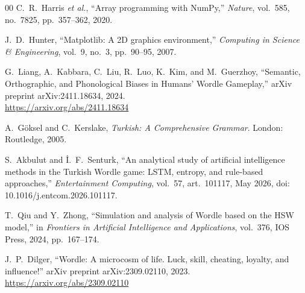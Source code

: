 \documentclass[conference]{IEEEtran}
\begin{document}
\begin{thebibliography}{00}
C.~R.~Harris \textit{et al.}, ``Array programming with NumPy,''
\textit{Nature}, vol.~585, no.~7825, pp.~357--362, 2020.

J.~D.~Hunter, ``Matplotlib: A 2D graphics environment,''
\textit{Computing in Science \& Engineering}, vol.~9, no.~3, pp.~90--95,
2007.

G.~Liang, A.~Kabbara, C.~Liu, R.~Luo, K.~Kim, and M.~Guerzhoy,
``Semantic, Orthographic, and Phonological Biases in Humans' Wordle
Gameplay,'' arXiv preprint arXiv:2411.18634, 2024.\\
\url{https://arxiv.org/abs/2411.18634}

A.~Göksel and C.~Kerslake,
\textit{Turkish: A Comprehensive Grammar}. London: Routledge, 2005.

S.~Akbulut and \.{I}.~F.~Senturk, ``An analytical study of artificial
intelligence methods in the Turkish Wordle game: LSTM, entropy, and
rule-based approaches,'' \textit{Entertainment Computing}, vol.~57,
art.~101117, May 2026, doi: 10.1016/j.entcom.2026.101117.

T.~Qiu and Y.~Zhong, ``Simulation and analysis of Wordle based on the HSW
model,'' in \textit{Frontiers in Artificial Intelligence and Applications},
vol.~376, IOS Press, 2024, pp.~167--174.

J.~P.~Dilger, ``Wordle: A microcosm of life. Luck, skill, cheating,
loyalty, and influence!'' arXiv preprint arXiv:2309.02110, 2023.\\
\url{https://arxiv.org/abs/2309.02110}

\end{thebibliography}
\end{document}
